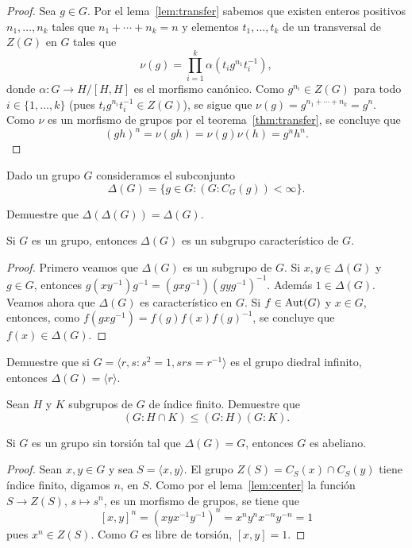 \begin{proof}
	Sea $g\in G$.  Por el lema~\ref{lem:transfer} sabemos que existen enteros
	positivos $n_1,\dots,n_k$ tales que $n_1+\cdots+n_k=n$ y elementos
	$t_1,\dots,t_k$ de un transversal de $Z(G)$ en $G$ tales que 
	\[
		\nu(g)=\prod_{i=1}^k \alpha(t_ig^{n_1}t_i^{-1}),
	\]
	donde $\alpha\colon G\to H/[H,H]$ es el morfismo canónico.  Como
	$g^{n_i}\in Z(G)$ para todo $i\in\{1,\dots,k\}$ (pues $t_ig^{n_i}t_i^{-1}\in Z(G)$), se sigue que
	$\nu(g)=g^{n_1+\cdots+n_k}=g^n$.  Como $\nu$ es un morfismo de
	grupos por el teorema~\ref{thm:transfer}, se concluye que
	\[
		(gh)^n=\nu(gh)=\nu(g)\nu(h)=g^nh^n. 
	\]
\end{proof}

Dado un grupo $G$ consideramos 
el subconjunto
\[
	\Delta(G)=\{g\in G:(G:C_G(g))<\infty\}.
\]

\begin{exercise}
	Demuestre que $\Delta(\Delta(G))=\Delta(G)$.
\end{exercise}

\begin{lemma}
	Si $G$ es un grupo, entonces $\Delta(G)$ es un subgrupo característico de
	$G$.
\end{lemma}

\begin{proof}
	Primero veamos que $\Delta(G)$ es un subgrupo de $G$. Si $x,y\in\Delta(G)$
	y $g\in G$, entonces $g(xy^{-1})g^{-1}=(gxg^{-1})(gyg^{-1})^{-1}$. Además
	$1\in\Delta(G)$. Veamos ahora que $\Delta(G)$ es característico en $G$. Si
	$f\in\operatorname{Aut}(G)$ y $x\in G$, entonces, como $f(gxg^{-1})=f(g)f(x)f(g)^{-1}$,
	se concluye que $f(x)\in\Delta(G)$.
\end{proof}

\begin{exercise}
	Demuestre que si $G=\langle r,s:s^2=1,srs=r^{-1}\rangle$ es el grupo
	diedral infinito, entonces $\Delta(G)=\langle r\rangle$.
\end{exercise}

\begin{exercise}
	Sean $H$ y $K$ subgrupos de $G$ de índice finito. Demuestre que 
	\[
	(G:H\cap K)\leq (G:H)(G:K). 
	\]
\end{exercise}

\begin{lemma}
	\label{lem:FCabeliano}
	Si $G$ es un grupo sin torsión tal que $\Delta(G)=G$, entonces $G$ es
	abeliano.
\end{lemma}

\begin{proof}
	Sean $x,y\in G$ y sea $S=\langle x,y\rangle$. El grupo $Z(S)=C_S(x)\cap C_S(y)$ tiene
	índice finito, digamos $n$, en $S$. Como por el lema~\ref{lem:center} la
	función $S\to Z(S)$, $s\mapsto s^n$, es un morfismo de grupos, se tiene que 
	\[
		[x,y]^n=(xyx^{-1}y^{-1})^n=x^ny^nx^{-n}y^{-n}=1
	\]
	pues $x^n\in Z(S)$. Como $G$ es libre de torsión, $[x,y]=1$.
\end{proof}

